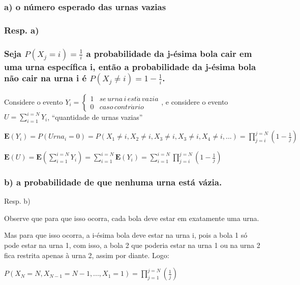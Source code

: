 \documentclass[english]{article}
\begin{document}
\subsubsection*{\textmd{a) o número esperado das urnas vazias}}


\subsubsection*{\textmd{Resp}. \textmd{a) }}


\subsubsection*{\textmd{Seja $P(X_{j}=i)=\frac{1}{i}$ a probabilidade da j-ésima
bola cair em uma urna específica i, então a probabilidade da j-ésima
bola não cair na urna i é $P(X_{j}\neq i)=1-\frac{1}{i}$.}}

Considere o evento $Y_{i}=\begin{cases}
1 & se\, urna\, i\, est\acute{a}\, vazia\\
0 & caso\, contr\acute{a}rio
\end{cases}$, e considere o evento $U=\sum_{i=1}^{i=N}Y_{i}$, ``quantidade de
urnas vazias''

$\mathbf{E}(Y_{i})=P(Urna_{i}=0)=P(X_{1}\neq i,X_{2}\neq i,X_{3}\neq i,X_{3}\neq i,X_{4}\neq i,...)=\prod_{j=i}^{j=N}(1-\frac{1}{j})$

$\mathbf{E}(U)=\mathbf{E}(\sum_{i=1}^{i=N}Y_{i})=\sum_{i=1}^{i=N}\mathbf{E}(Y_{i})=\sum_{i=1}^{i=N}\prod_{j=i}^{j=N}(1-\frac{1}{j})$


\subsubsection*{\textmd{b) a probabilidade de que nenhuma urna está vázia.}}

Resp. b)

Observe que para que isso ocorra, cada bola deve estar em exatamente
uma urna.

Mas para que isso ocorra, a i-ésima bola deve estar na urna i, pois
a bola 1 só pode estar na urna 1, com isso, a bola 2 que poderia estar
na urna 1 ou na urna 2 fica restrita apenas à urna 2, assim por diante.
Logo:

$P(X_{N}=N,X_{N-1}=N-1,...,X_{1}=1)=\prod_{j=1}^{j=N}(\frac{1}{j})$


\subsection*{\textcompwordmark{}}
\end{document}
